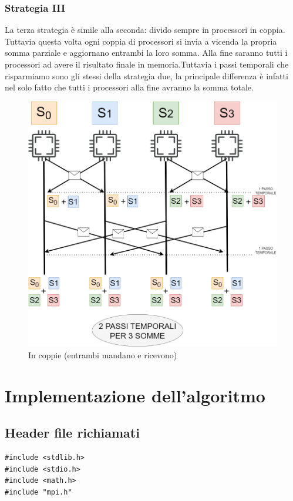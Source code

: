 \documentclass{article}
\begin{document}
\subsubsection{Strategia III}
    La terza strategia è simile alla seconda: divido sempre in processori in coppia.
    Tuttavia questa volta ogni coppia di processori si invia a vicenda la propria somma parziale e aggiornano entrambi la loro somma. Alla fine saranno tutti i processori ad avere il risultato finale in memoria.Tuttavia i passi temporali che risparmiamo sono gli stessi della strategia due, la principale differenza è infatti nel solo fatto che tutti i processori alla fine avranno la somma totale.
    \begin{figure}[!h tbp]
        \centering
        \includegraphics[width=1\linewidth]{strategia_III.drawio.png}
        \caption{In coppie (entrambi mandano e ricevono)}
        \label{fig:enter-label}
    \end{figure}
\clearpage
\section{Implementazione dell'algoritmo}
\subsection{Header file richiamati}
\begin{lstlisting}
#include <stdlib.h>
#include <stdio.h>
#include <math.h>
#include "mpi.h"
\end{lstlisting}
\end{document}
